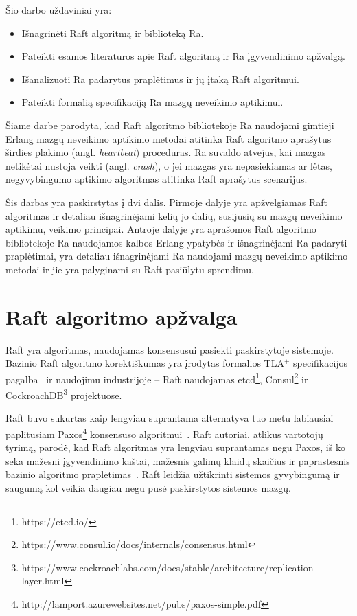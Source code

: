 \documentclass{VUMIFPSkursinis}
\begin{document}
Šio darbo uždaviniai yra:
\begin{itemize}
    \item Išnagrinėti Raft algoritmą ir biblioteką Ra.
    \item Pateikti esamos literatūros apie Raft algoritmą ir Ra įgyvendinimo apžvalgą.
    \item Išanalizuoti Ra padarytus praplėtimus ir jų įtaką Raft algoritmui.
    \item Pateikti formalią specifikaciją Ra mazgų neveikimo aptikimui.
\end{itemize}

Šiame darbe parodyta, kad Raft algoritmo bibliotekoje Ra naudojami gimtieji Erlang mazgų neveikimo aptikimo metodai atitinka Raft algoritmo aprašytus širdies plakimo (angl. \textit{heartbeat}) procedūras. Ra suvaldo atvejus, kai mazgas netikėtai nustoja veikti (angl. \textit{crash}), o jei mazgas yra nepasiekiamas ar lėtas, negyvybingumo aptikimo algoritmas atitinka Raft aprašytus scenarijus.

Šis darbas yra paskirstytas į dvi dalis. Pirmoje dalyje yra apžvelgiamas Raft algoritmas ir detaliau išnagrinėjami kelių jo dalių, susijusių su mazgų neveikimo aptikimu, veikimo principai. Antroje dalyje yra aprašomos Raft algoritmo bibliotekoje Ra naudojamos kalbos Erlang ypatybės ir išnagrinėjami Ra padaryti praplėtimai, yra detaliau išnagrinėjami Ra naudojami mazgų neveikimo aptikimo metodai ir jie yra palyginami su Raft pasiūlytu sprendimu.

\section{Raft algoritmo apžvalga}

Raft yra algoritmas, naudojamas konsensusui pasiekti paskirstytoje sistemoje. Bazinio Raft algoritmo  korektiškumas yra įrodytas formalios TLA$^+$ specifikacijos pagalba~\cite{ongaro_consensus} ir naudojimu industrijoje -- Raft naudojamas etcd\footnote{https://etcd.io/}, Consul\footnote{https://www.consul.io/docs/internals/consensus.html} ir CockroachDB\footnote{https://www.cockroachlabs.com/docs/stable/architecture/replication-layer.html} projektuose. 

Raft buvo sukurtas kaip lengviau suprantama alternatyva tuo metu labiausiai paplitusiam Paxos\footnote{http://lamport.azurewebsites.net/pubs/paxos-simple.pdf} konsensuso algoritmui~\cite{ongaro_consensus, diego_designing_2016}. Raft autoriai, atlikus vartotojų tyrimą, parodė, kad Raft algoritmas yra lengviau suprantamas negu Paxos, iš ko seka mažesni įgyvendinimo kaštai, mažesnis galimų klaidų skaičius ir paprastesnis bazinio algoritmo praplėtimas~\cite{ongaro_consensus}. Raft leidžia užtikrinti sistemos gyvybingumą ir saugumą kol veikia daugiau negu pusė paskirstytos sistemos mazgų. 
\end{document}
